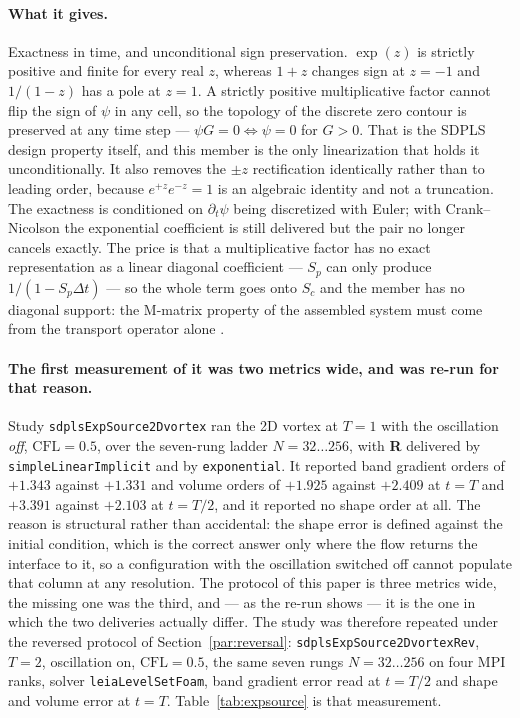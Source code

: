 \documentclass[preprint,3p,11pt]{elsarticle}
\newcommand{\psilev}{\psi}
\begin{document}
\paragraph{What it gives.} Exactness in time, and unconditional sign
preservation. $\exp(z)$ is strictly positive and finite for every real $z$,
whereas $1+z$ changes sign at $z=-1$ and $1/(1-z)$ has a pole at $z=1$. A
strictly positive multiplicative factor cannot flip the sign of $\psilev$ in any
cell, so the topology of the discrete zero contour is preserved at any time step
--- $\psilev G = 0 \iff \psilev = 0$ for $G>0$. That is the SDPLS design property
itself, and this member is the only linearization that holds it unconditionally.
It also removes the $\pm z$ rectification identically rather than to leading
order, because $e^{+z}e^{-z}=1$ is an algebraic identity and not a truncation.
The exactness is conditioned on $\partial_t\psilev$ being discretized with Euler;
with Crank--Nicolson the exponential coefficient is still delivered but the pair
no longer cancels exactly. The price is that a multiplicative factor has no exact
representation as a linear diagonal coefficient --- $S_p$ can only produce
$1/(1-S_p\Delta t)$ --- so the whole term goes onto $S_c$ and the member has no
diagonal support: the M-matrix property of the assembled system must come from
the transport operator alone \cite{patankar1980}.

\paragraph{The first measurement of it was two metrics wide, and was re-run for
that reason.} Study \texttt{sdplsExpSource2Dvortex} ran the 2D vortex at $T=1$
with the oscillation \emph{off}, $\mathrm{CFL}=0.5$, over the seven-rung ladder
$N=32\ldots256$, with \textbf{R} delivered by \texttt{simpleLinearImplicit} and by
\texttt{exponential}. It reported band gradient orders of $+1.343$ against
$+1.331$ and volume orders of $+1.925$ against $+2.409$ at $t=T$ and $+3.391$
against $+2.103$ at $t=T/2$, and it reported no shape order at all. The reason is
structural rather than accidental: the shape error is defined against the initial
condition, which is the correct answer only where the flow returns the interface
to it, so a configuration with the oscillation switched off cannot populate that
column at any resolution. The protocol of this paper is three metrics wide, the
missing one was the third, and --- as the re-run shows --- it is the one in which
the two deliveries actually differ. The study was therefore repeated under the
reversed protocol of Section~\ref{par:reversal}:
\texttt{sdplsExpSource2DvortexRev}, $T=2$, oscillation on, $\mathrm{CFL}=0.5$,
the same seven rungs $N = 32\ldots256$ on four MPI ranks, solver
\texttt{leiaLevelSetFoam}, band gradient error read at $t=T/2$ and shape and
volume error at $t=T$. Table~\ref{tab:expsource} is that measurement.
\end{document}
